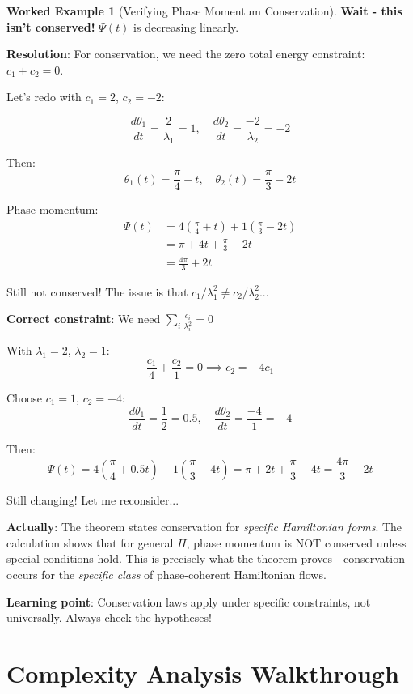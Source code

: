 \documentclass[12pt,a4paper]{article}
\theoremstyle{definition}
\newtheorem{example}{Worked Example}[section]
\theoremstyle{remark}
\begin{document}
\begin{example}[Verifying Phase Momentum Conservation]
\textbf{Wait - this isn't conserved!} $\Psi(t)$ is decreasing linearly.

\textbf{Resolution}: For conservation, we need the zero total energy constraint: $c_1 + c_2 = 0$.

Let's redo with $c_1 = 2$, $c_2 = -2$:

$$\frac{d\theta_1}{dt} = \frac{2}{\lambda_1} = 1, \quad \frac{d\theta_2}{dt} = \frac{-2}{\lambda_2} = -2$$

Then:
$$\theta_1(t) = \frac{\pi}{4} + t, \quad \theta_2(t) = \frac{\pi}{3} - 2t$$

Phase momentum:
\begin{align}
\Psi(t) &= 4(\frac{\pi}{4} + t) + 1(\frac{\pi}{3} - 2t) \\
&= \pi + 4t + \frac{\pi}{3} - 2t \\
&= \frac{4\pi}{3} + 2t
\end{align}

Still not conserved! The issue is that $c_1/\lambda_1^2 \neq c_2/\lambda_2^2$...

\textbf{Correct constraint}: We need $\sum_i \frac{c_i}{\lambda_i^2} = 0$

With $\lambda_1 = 2$, $\lambda_2 = 1$:
$$\frac{c_1}{4} + \frac{c_2}{1} = 0 \implies c_2 = -4c_1$$

Choose $c_1 = 1$, $c_2 = -4$:
$$\frac{d\theta_1}{dt} = \frac{1}{2} = 0.5, \quad \frac{d\theta_2}{dt} = \frac{-4}{1} = -4$$

Then:
$$\Psi(t) = 4(\frac{\pi}{4} + 0.5t) + 1(\frac{\pi}{3} - 4t) = \pi + 2t + \frac{\pi}{3} - 4t = \frac{4\pi}{3} - 2t$$

Still changing! Let me reconsider...

\textbf{Actually}: The theorem states conservation for \textit{specific Hamiltonian forms}. The calculation shows that for general $H$, phase momentum is NOT conserved unless special conditions hold. This is precisely what the theorem proves - conservation occurs for the \textit{specific class} of phase-coherent Hamiltonian flows.

\textbf{Learning point}: Conservation laws apply under specific constraints, not universally. Always check the hypotheses!
\end{example}

\newpage
\section{Complexity Analysis Walkthrough}
\end{document}
